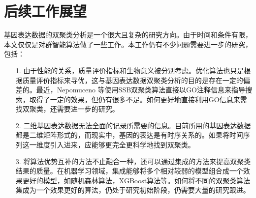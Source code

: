 \section{后续工作展望}
基因表达数据的双聚类分析是一个很大且复杂的研究方向。由于时间和条件有限，本文仅仅是对群智能算法做了一些工作。本工作仍有不少问题需要进一步的研究，包括：
\begin{itemize}
    \item [1.]{由于性能的关系，质量评价指标和生物意义被分别考虑。优化算法也只是根据质量评价指标来寻优，这与基因表达数据双聚类分析的目的是存在一定的偏差的。最近，Nepomuceno 等使用SSB双聚类算法直接以GO注释信息来指导搜索，取得了一定的效果，但仍有很多不足。如何更好地直接利用GO信息来需找双聚类，还需要进一步的研究。}

    \item [2.]{二维基因表达数据无法全面的记录所需要的信息。目前所用的基因表达数据都是二维矩阵形式的，而现实中，基因的表达是有时序关系的。如果将时间序列这一维度引入进来，应能够更完全更科学地找到双聚类。}

    \item [3.]{将算法优势互补的方法不止融合一种，还可以通过集成的方法来提高双聚类结果的质量。在机器学习领域，集成能够将多个相对较弱的模型组合成一个效果更好的模型，如随机森林算法，XGBoost算法等。如何将不同的双聚类算法集成为一个效果更好的算法，仍处于研究初始阶段，仍需要大量的研究跟进。}
    
\end{itemize}